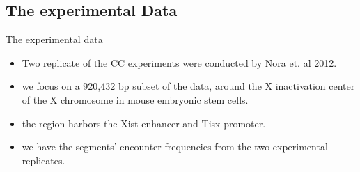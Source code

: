 \documentclass[8pt]{beamer}
\begin{document}
\subsection{The experimental Data}\label{subsection_theExperimentalData}
\begin{frame}{The experimental data}
\begin{itemize}
\item Two replicate of the CC experiments were conducted by Nora et. al 2012. 
\item we focus on a 920,432 bp subset of the data, around the X inactivation center of the X chromosome in mouse embryonic stem cells. 
\item the region harbors the Xist enhancer and Tisx promoter.
\item we have the segments' encounter frequencies from the two experimental replicates.
\end{itemize}
\end{frame}
\end{document}
